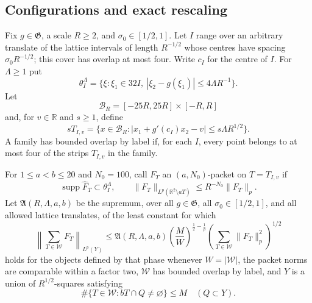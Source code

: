 \documentclass[11pt,letterpaper]{amsart}
\newcommand{\supp}{\operatorname{supp}}
\begin{document}
\subsection{Configurations and exact rescaling}

Fix $g\in\mathfrak G$, a scale $R\ge2$, and
$\sigma_0\in[1/2,1]$.  Let $I$ range over an arbitrary translate of the
lattice intervals of length $R^{-1/2}$ whose centres have spacing
$\sigma_0R^{-1/2}$; this cover has overlap at most four.  Write $c_I$ for
the centre of $I$.  For $\Lambda\ge1$ put
\begin{equation}\label{eq:appendix-cap}
 \theta_I^\Lambda
 =\{\xi:\xi_1\in32I,\ |\xi_2-g(\xi_1)|\le4\Lambda R^{-1}\}.
\end{equation}
Let
\[
 \mathcal B_R=[-25R,25R]\times[-R,R]
\]
and, for $v\in\mathbb R$ and $s\ge1$, define
\begin{equation}\label{eq:appendix-strip}
 sT_{I,v}
 =\{x\in\mathcal B_R:
 |x_1+g'(c_I)x_2-v|\le s\Lambda R^{1/2}\}.
\end{equation}
A family has bounded overlap by label if, for each $I$, every point belongs
to at most four of the strips $T_{I,v}$ in the family.

For $1\le a<b\le20$ and $N_0=100$, call $F_T$ an $(a,N_0)$-packet on
$T=T_{I,v}$ if
\begin{equation}\label{eq:appendix-packet}
 \supp\widehat F_T\subset\theta_I^\Lambda,
 \qquad
 \|F_T\|_{L^p(\mathbb R^2\setminus aT)}
 \le R^{-N_0}\|F_T\|_p.
\end{equation}
Let $\mathfrak A(R,\Lambda,a,b)$ be the supremum, over all
$g\in\mathfrak G$, all $\sigma_0\in[1/2,1]$, and all allowed lattice
translates, of the least constant for which
\begin{equation}\label{eq:appendix-Adef}
 \left\|\sum_{T\in\mathcal W}F_T\right\|_{L^p(Y)}
 \le \mathfrak A(R,\Lambda,a,b)
 \left(\frac{M}{W}\right)^{\frac12-\frac1p}
 \left(\sum_{T\in\mathcal W}\|F_T\|_p^2\right)^{1/2}
\end{equation}
holds for the objects defined by that phase whenever
$W=|\mathcal W|$, the packet norms are comparable within a factor two,
$\mathcal W$ has bounded overlap by label, and $Y$ is a union of
$R^{1/2}$-squares satisfying
\begin{equation}\label{eq:appendix-multiplicity}
 \#\{T\in\mathcal W:bT\cap Q\ne\varnothing\}\le M
 \quad(Q\subset Y).
\end{equation}
\end{document}
